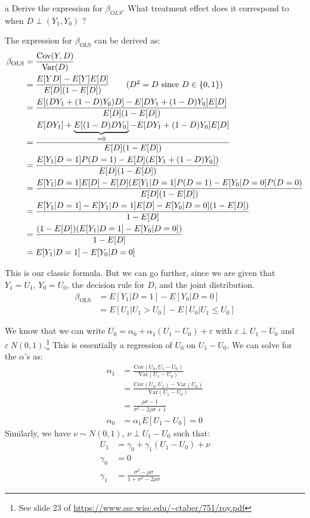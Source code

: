 \documentclass{article}
\begin{document}
\begin{problem}{a}
Derive the expression for $\beta_{O L S}$. What treatment effect does it correspond to when $D \perp\left(Y_{1}, Y_{0}\right)$ ?
\end{problem}
\begin{solution}
The expression for $\beta_\text{OLS}$ can be derived as:
\begin{align*}
    \beta_\text{OLS} &= \frac{\text{Cov}(Y,D)}{\text{Var}(D)} \\
    &= \frac{E[YD]-E[Y]E[D]}{E[D](1-E[D])} \tag{$D^2 = D$ since $D\in\{0,1\}$} \\
    &= \frac{E[(DY_1+(1-D)Y_0)D]-E[DY_1+(1-D)Y_0]E[D]}{E[D](1-E[D])} \\
    &= \frac{E[D Y_1]+\underbrace{E[(1-D)D  Y_0]}_{=0}-E[DY_1+(1-D)Y_0]E[D]}{E[D](1-E[D])} \\
    &= \frac{E[Y_1|D=1]P(D=1)-E[D](E[Y_1+(1-D)Y_0])}{E[D](1-E[D])} \\
    &= \frac{E[Y_1|D=1]E[D]-E[D](E[Y_1|D=1]P(D=1)-E[Y_0|D=0]P(D=0)}{E[D](1-E[D])} \\
    &= \frac{E[Y_1|D=1]-E[Y_1|D=1]E[D]-E[Y_0|D=0](1-E[D])}{1-E[D]} \\
    &= \frac{(1-E[D])(E[Y_1|D=1]-E[Y_0|D=0])}{1-E[D]} \\
    &= E[Y_1|D=1]-E[Y_0|D=0]
\end{align*}

This is our classic formula. But we can go further, since we are given that $Y_1=U_1$, $Y_0=U_0$, the decision rule for $D$, and the joint distribution. 
\begin{align*}
    \beta_\text{OLS} &= E[Y_1|D=1]-E[Y_0|D=0] \\
    &= E[U_1|U_1>U_0]-E[U_0|U_1\leq U_0]
\end{align*}

We know that we can write $U_0=\alpha_0+\alpha_1 (U_1-U_0) + \varepsilon$ with $\varepsilon \perp U_1-U_0$ and $\varepsilon ~ N(0,1)$.\footnote{See slide 23 of \url{https://www.ssc.wisc.edu/~ctaber/751/roy.pdf}} This is essentially a regression of $U_0$ on $U_1-U_0$. We can solve for the $\alpha$'s as:
\begin{align*}
    \alpha_1 &= \frac{\text{Cov}(U_0,U_1-U_0)}{\text{Var}(U_1-U_0)} \\
    &= \frac{\text{Cov}(U_0,U_1)-\text{Var}(U_0)}{\text{Var}(U_1-U_0)} \\
    &= \frac{\rho \sigma - 1}{\sigma^2-2\rho\sigma+1} \\
    \alpha_0 &= \alpha_1 E[U_1-U_0] = 0
\end{align*}
Similarly, we have $\nu \sim N(0,1)$, $\nu \perp U_1-U_0$ such that:
\begin{align*}
    U_1&=\gamma_0+\gamma_1 (U_1-U_0) + \nu \\
    \gamma_0 &= 0 \\
    \gamma_1 &= \frac{\sigma^2-\rho\sigma}{1+\sigma^2-2\rho\sigma}
\end{align*}


\end{solution}
\end{document}
